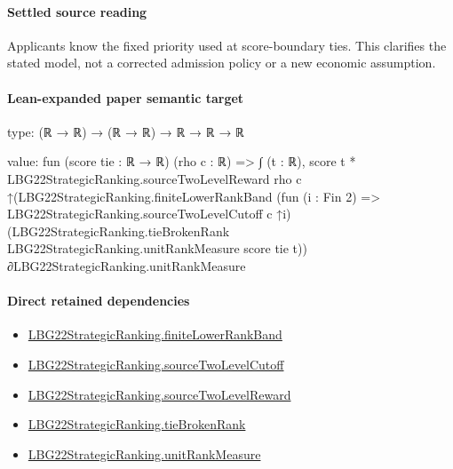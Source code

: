 \documentclass[10pt]{article}
\begin{document}
\paragraph{Settled source reading}
\begin{sloppypar}
Applicants know the fixed priority used at score-\allowbreak{}boundary ties.\allowbreak{} This clarifies the stated model, not a corrected admission policy or a new economic assumption.\allowbreak{}
\end{sloppypar}

\paragraph{Lean-expanded paper semantic target}
\begin{ReviewVerbatim}
type:
(ℝ → ℝ) → (ℝ → ℝ) → ℝ → ℝ → ℝ

value:
fun (score tie : ℝ → ℝ) (rho c : ℝ) =>
  ∫ (t : ℝ),
    score t *
      LBG22StrategicRanking.sourceTwoLevelReward rho c
        ↑(LBG22StrategicRanking.finiteLowerRankBand (fun (i : Fin 2) => LBG22StrategicRanking.sourceTwoLevelCutoff c ↑i)
            (LBG22StrategicRanking.tieBrokenRank LBG22StrategicRanking.unitRankMeasure score tie
              t)) ∂LBG22StrategicRanking.unitRankMeasure
\end{ReviewVerbatim}

\paragraph{Direct retained dependencies}
\begin{itemize}\raggedright
\item \hyperlink{paper-prerequisite-a42f440ddc254fa7}{LBG22\allowbreak{}Strategic\allowbreak{}Ranking.\allowbreak{}finite\allowbreak{}Lower\allowbreak{}Rank\allowbreak{}Band}
\item \hyperlink{paper-prerequisite-f88aac58507e44ca}{LBG22\allowbreak{}Strategic\allowbreak{}Ranking.\allowbreak{}source\allowbreak{}Two\allowbreak{}Level\allowbreak{}Cutoff}
\item \hyperlink{paper-prerequisite-30d97cd43eb79017}{LBG22\allowbreak{}Strategic\allowbreak{}Ranking.\allowbreak{}source\allowbreak{}Two\allowbreak{}Level\allowbreak{}Reward}
\item \hyperlink{paper-prerequisite-b7c71e53177b76c6}{LBG22\allowbreak{}Strategic\allowbreak{}Ranking.\allowbreak{}tie\allowbreak{}Broken\allowbreak{}Rank}
\item \hyperlink{governing-declaration-678cf48d549cb620}{LBG22\allowbreak{}Strategic\allowbreak{}Ranking.\allowbreak{}unit\allowbreak{}Rank\allowbreak{}Measure}
\end{itemize}
\end{document}
